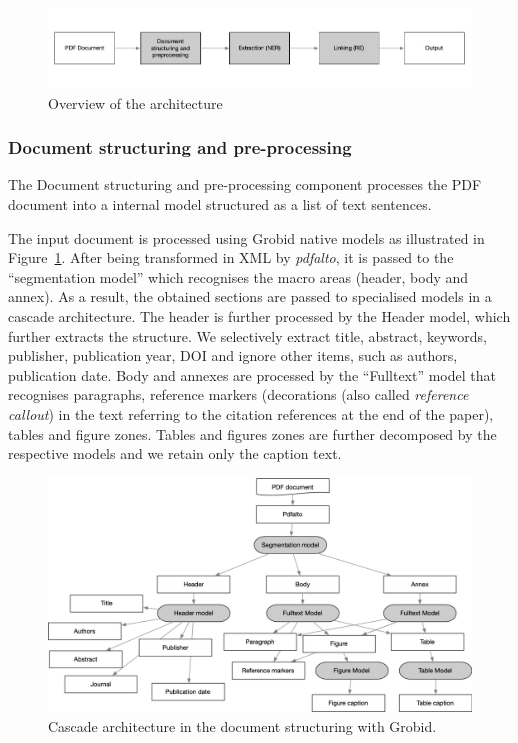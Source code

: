 \documentclass{article}
\begin{document}
\begin{figure}[ht]
\includegraphics[width=\textwidth]{overview-schema}
\caption{Overview of the architecture}
\end{figure}

\subsubsection{Document structuring and pre-processing}
\label{subsubsec:document-structuring}
The Document structuring and pre-processing component processes the PDF document into a internal model structured as a list of text sentences.

The input document is processed using Grobid native models as illustrated in Figure~\ref{fig:grobid-document-processing}. After being transformed in XML by \textit{pdfalto}, it is passed to the ``segmentation model'' which recognises the macro areas (header, body and annex). As a result, the obtained sections are passed to specialised models in a cascade architecture. The header is further processed by the Header model, which further extracts the structure. We selectively extract title, abstract, keywords, publisher, publication year, DOI and ignore other items, such as authors, publication date. 
Body and annexes are processed by the ``Fulltext'' model that recognises paragraphs, reference markers (decorations (also called \textit{reference callout}) in the text referring to the citation references at the end of the paper), tables and figure zones.
Tables and figures zones are further decomposed by the respective models and we retain only the caption text. 

\begin{figure}[ht]
\label{fig:grobid-document-processing}
\includegraphics[width=\textwidth]{grobid-extraction-schema}
\caption{Cascade architecture in the document structuring with Grobid.}
\end{figure}
\end{document}
